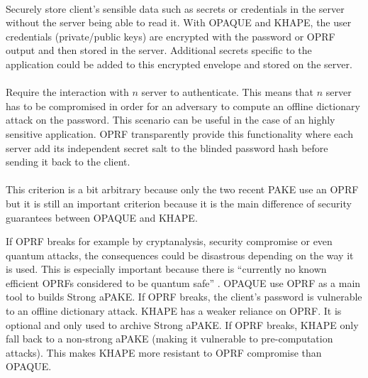 \documentclass[../report.tex]{subfiles}
\begin{document}
\paragraph{}
Securely store client's sensible data such as secrets or credentials in the server without the server being able to read it. With OPAQUE and KHAPE, the user credentials (private/public keys) are encrypted with the password or OPRF output and then stored in the server. Additional secrets specific to the application could be added to this encrypted envelope and stored on the server.

\paragraph{}
Require the interaction with $n$ server to authenticate. This means that $n$ server has to be compromised in order for an adversary to compute an offline dictionary attack on the password. This scenario can be useful in the case of an highly sensitive application.
OPRF transparently provide this functionality where each server add its independent secret salt to the blinded password hash before sending it back to the client.

\paragraph{}
This criterion is a bit arbitrary because only the two recent PAKE use an OPRF but it is still an important criterion because it is the main difference of security guarantees between OPAQUE and KHAPE.

If OPRF breaks for example by cryptanalysis, security compromise or even quantum attacks, the consequences could be disastrous depending on the way it is used. This is especially important because there is ``currently no known efficient OPRFs considered to be quantum safe'' \cite{KHAPE_Paper}.
OPAQUE use OPRF as a main tool to builds Strong aPAKE. If OPRF breaks, the client's password is vulnerable to an offline dictionary attack.
KHAPE has a weaker reliance on OPRF. It is optional and only used to archive Strong aPAKE. If OPRF breaks, KHAPE only fall back to a non-strong aPAKE (making it vulnerable to pre-computation attacks). 
This makes KHAPE more resistant to OPRF compromise than OPAQUE. 
\end{document}
